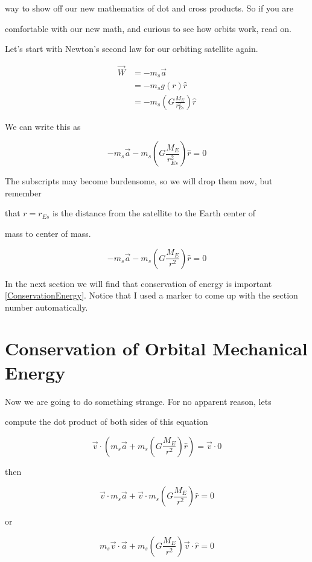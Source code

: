 way to show off our new mathematics of dot and cross products. So if you are

comfortable with our new math, and curious to see how orbits work, read on.



Let's start with Newton's second law for our orbiting satellite again.

\begin{align*}
\overrightarrow{W}&=-m_{s}\overrightarrow{a}\\
&=-m_{s}g\left( r\right) \hat{r}\\
&=-m_{s}\left( G\frac{M_{E}}{r_{Es}^{2}}\right) \hat{r}
\end{align*}




We can write this as 

$$
-m_{s}\overrightarrow{a}-m_{s}\left( G\frac{M_{E}}{r_{Es}^{2}}\right) \hat{r}=0
$$


The subscripts may become burdensome, so we will drop them now, but remember

that $r=r_{Es}$ is the distance from the satellite to the Earth center of

mass to center of mass. 

$$-m_{s}\overrightarrow{a}-m_{s}\left( G\frac{M_{E}}{r^{2}}\right) \hat{r}=0$$

In the next section we will find that conservation of energy is important \ref{ConservationEnergy}. Notice that I used a marker to come up with the section number automatically.

\section{Conservation of Orbital Mechanical Energy\label{ConservationEnergy}}


Now we are going to do something strange. For no apparent reason, lets

compute the dot product of both sides of this equation 

$$\overrightarrow{v}\cdot \left( m_{s}\overrightarrow{a}+m_{s}\left( G\frac{M_{E}}{r^{2}}\right) \hat{r}\right) =\overrightarrow{v}\cdot 0 $$

then 

$$\overrightarrow{v}\cdot m_{s}\overrightarrow{a}+\overrightarrow{v}\cdot m_{s}\left( G\frac{M_{E}}{r^{2}}\right) \hat{r}=0 $$

or

$$m_{s}\overrightarrow{v}\cdot \overrightarrow{a}+m_{s}\left( G\frac{M_{E}}{r^{2}}\right) \overrightarrow{v}\cdot \hat{r}=0 $$


